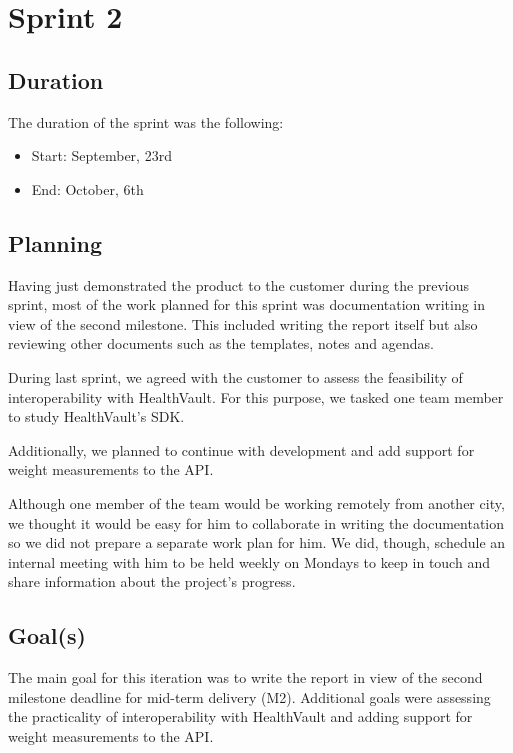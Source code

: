
\chapter{Sprint 2}
\label{Sprint2}

\section{Duration}
The duration of the sprint was the following:
\begin{itemize}
\item Start: September, 23rd
\item End: October, 6th
\end{itemize}

\section{Planning}

Having just demonstrated the product to the customer during the previous sprint, 
most of the work planned for this sprint was documentation writing in view of the second milestone.
This included writing the report itself but also reviewing other documents such as the
templates, notes and agendas.

During last sprint, we agreed with the customer to assess the feasibility of interoperability
with HealthVault. For this purpose, we tasked one team member to study HealthVault's SDK.

Additionally, we planned to continue with development and add support for weight
measurements to the API.

Although one member of the team would be working remotely from another city,
we thought it would be easy for him to collaborate in writing the documentation
so we did not prepare a separate work plan for him.
We did, though, schedule an internal meeting with him to be held weekly on Mondays
to keep in touch and share information about the project's progress.


\section{Goal(s)}

The main goal for this iteration was to write the report in view of the second milestone deadline
for mid-term delivery (M2). Additional goals were assessing the practicality of interoperability
with HealthVault and adding support for weight measurements to the API.

